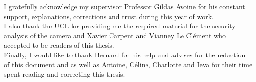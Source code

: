 \vspace{5cm}

I gratefully acknowledge my supervisor Professor Gildas Avoine for his constant support, explanations, corrections and trust during this year of work.\\

I also thank the UCL for providing me the required material for the security analysis of the camera and Xavier Carpent and Vianney Le Clément who accepted to be readers of this thesis.\\

Finally, I would like to thank Bernard for his help and advises for the redaction of this document and as well as Antoine, Céline, Charlotte and Ieva for their time spent reading and correcting this thesis.
